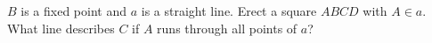 $B$ is a fixed point and $a$ is a straight line. Erect a square $ABCD$ with $A \in a$. What line describes $C$ if $A$ runs through all points of $a$?
